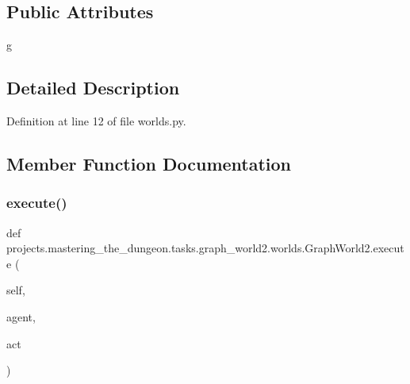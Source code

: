 \subsection*{Public Attributes}
\begin{DoxyCompactItemize}
\item 
\hyperlink{classprojects_1_1mastering__the__dungeon_1_1tasks_1_1graph__world2_1_1worlds_1_1GraphWorld2_a3df3da0c9fe46e780d274bb455003f37}{g}
\end{DoxyCompactItemize}


\subsection{Detailed Description}


Definition at line 12 of file worlds.\+py.



\subsection{Member Function Documentation}
\mbox{\label{classprojects_1_1mastering__the__dungeon_1_1tasks_1_1graph__world2_1_1worlds_1_1GraphWorld2_a5b99d2c00a74a0fd782df6505a12180d}} 
\subsubsection{\texorpdfstring{execute()}{execute()}}
{\footnotesize\ttfamily def projects.\+mastering\+\_\+the\+\_\+dungeon.\+tasks.\+graph\+\_\+world2.\+worlds.\+Graph\+World2.\+execute (\begin{DoxyParamCaption}\item[{}]{self,  }\item[{}]{agent,  }\item[{}]{act }\end{DoxyParamCaption})}



